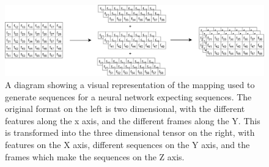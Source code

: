 \documentclass[a4paper,11pt,notitlepage]{article}
\begin{document}
\begin{figure}[H]
	\centering
	\vspace{0.5cm}
	\includegraphics[scale = 0.15]{diagrams/sequence_generation.png}
	\caption{A diagram showing a visual representation of the mapping used to generate sequences for a neural network expecting sequences. The original format on the left is two dimensional, with the different features along the x axis, and the different frames along the Y. This is transformed into the three dimensional tensor on the right, with features on the X axis, different sequences on the Y axis, and the frames which make the sequences on the Z axis.}
	\label{sequence_generation_mapping}
\end{figure}
\end{document}
